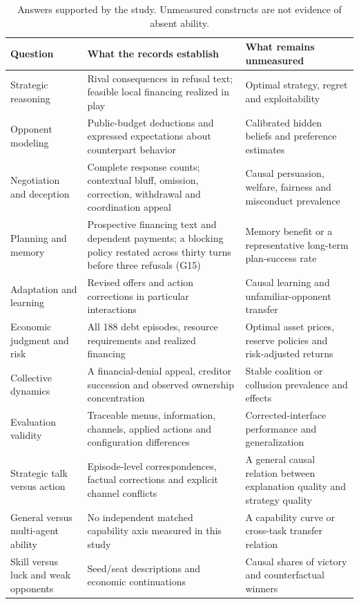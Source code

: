 \begin{longtable}{@{}L{.24\linewidth}L{.39\linewidth}L{.31\linewidth}@{}}
\caption{Answers supported by the study. Unmeasured constructs are not evidence of absent ability.}\\
\toprule Question & What the records establish & What remains unmeasured\\\midrule\endhead
Strategic reasoning & Rival consequences in refusal text; feasible local financing realized in play & Optimal strategy, regret and exploitability\\
Opponent modeling & Public-budget deductions and expressed expectations about counterpart behavior & Calibrated hidden beliefs and preference estimates\\
Negotiation and deception & Complete response counts; contextual bluff, omission, correction, withdrawal and coordination appeal & Causal persuasion, welfare, fairness and misconduct prevalence\\
Planning and memory & Prospective financing text and dependent payments; a blocking policy restated across thirty turns before three refusals (G15) & Memory benefit or a representative long-term plan-success rate\\
Adaptation and learning & Revised offers and action corrections in particular interactions & Causal learning and unfamiliar-opponent transfer\\
Economic judgment and risk & All 188 debt episodes, resource requirements and realized financing & Optimal asset prices, reserve policies and risk-adjusted returns\\
Collective dynamics & A financial-denial appeal, creditor succession and observed ownership concentration & Stable coalition or collusion prevalence and effects\\
Evaluation validity & Traceable menus, information, channels, applied actions and configuration differences & Corrected-interface performance and generalization\\\midrule
Strategic talk versus action & Episode-level correspondences, factual corrections and explicit channel conflicts & A general causal relation between explanation quality and strategy quality\\
General versus multi-agent ability & No independent matched capability axis measured in this study & A capability curve or cross-task transfer relation\\
Skill versus luck and weak opponents & Seed/seat descriptions and economic continuations & Causal shares of victory and counterfactual winners\\\bottomrule
\end{longtable}

